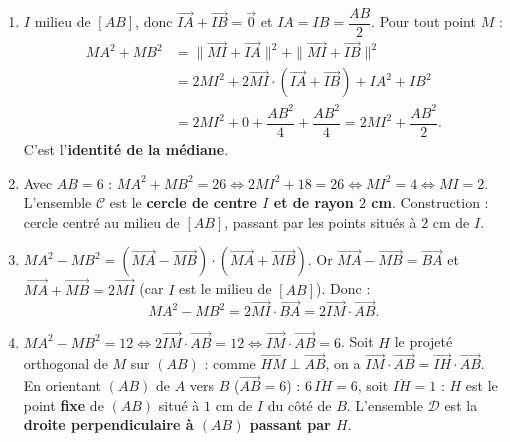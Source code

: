 \documentclass[11pt]{article}
\begin{document}
\begin{corrige}
\begin{enumerate}
\item $I$ milieu de $[AB]$, donc $\overrightarrow{IA}+\overrightarrow{IB}=\vec{0}$ et $IA=IB=\dfrac{AB}{2}$. Pour tout point $M$ :
\begin{align*}
MA^2+MB^2&=\|\overrightarrow{MI}+\overrightarrow{IA}\|^2+\|\overrightarrow{MI}+\overrightarrow{IB}\|^2\\
&=2MI^2+2\overrightarrow{MI}\cdot(\overrightarrow{IA}+\overrightarrow{IB})+IA^2+IB^2\\
&=2MI^2+0+\dfrac{AB^2}{4}+\dfrac{AB^2}{4}=2MI^2+\dfrac{AB^2}{2}.
\end{align*}
C'est l'\textbf{identité de la médiane}.
\item Avec $AB=6$ : $MA^2+MB^2=26\iff 2MI^2+18=26\iff MI^2=4\iff MI=2$. L'ensemble $\mathcal{C}$ est le \textbf{cercle de centre $I$ et de rayon $2$ cm}. Construction : cercle centré au milieu de $[AB]$, passant par les points situés à $2$ cm de $I$.
\item $MA^2-MB^2=(\overrightarrow{MA}-\overrightarrow{MB})\cdot(\overrightarrow{MA}+\overrightarrow{MB})$. Or $\overrightarrow{MA}-\overrightarrow{MB}=\overrightarrow{BA}$ et $\overrightarrow{MA}+\overrightarrow{MB}=2\overrightarrow{MI}$ (car $I$ est le milieu de $[AB]$). Donc :
\[ MA^2-MB^2=2\overrightarrow{MI}\cdot\overrightarrow{BA}=2\overrightarrow{IM}\cdot\overrightarrow{AB}. \]
\item $MA^2-MB^2=12\iff 2\overrightarrow{IM}\cdot\overrightarrow{AB}=12\iff \overrightarrow{IM}\cdot\overrightarrow{AB}=6$. Soit $H$ le projeté orthogonal de $M$ sur $(AB)$ : comme $\overrightarrow{HM}\perp\overrightarrow{AB}$, on a $\overrightarrow{IM}\cdot\overrightarrow{AB}=\overrightarrow{IH}\cdot\overrightarrow{AB}$. En orientant $(AB)$ de $A$ vers $B$ ($\overrightarrow{AB}=6$) : $6\,\overline{IH}=6$, soit $\overline{IH}=1$ : $H$ est le point \textbf{fixe} de $(AB)$ situé à $1$ cm de $I$ du côté de $B$. L'ensemble $\mathcal{D}$ est la \textbf{droite perpendiculaire à $(AB)$ passant par $H$}.
\end{enumerate}
\end{corrige}
\end{document}
